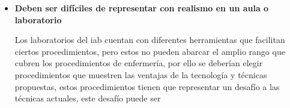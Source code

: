 \begin{itemize}
\item \textbf{Deben ser difíciles de representar con realismo en un aula o
        laboratorio}

    Los laboratorios del \Gls{iab} cuentan con diferentes herramientas que
    facilitan ciertos procedimientos, pero estos no pueden abarcar el amplio
    rango que cubren los procedimientos de enfermería, por ello se deberían
    elegir procedimientos que muestren las ventajas de la tecnología y técnicas
    propuestas, estos procedimientos tienen que representar un desafío a las
    técnicas actuales, este desafío puede ser 
    
\end{itemize}
